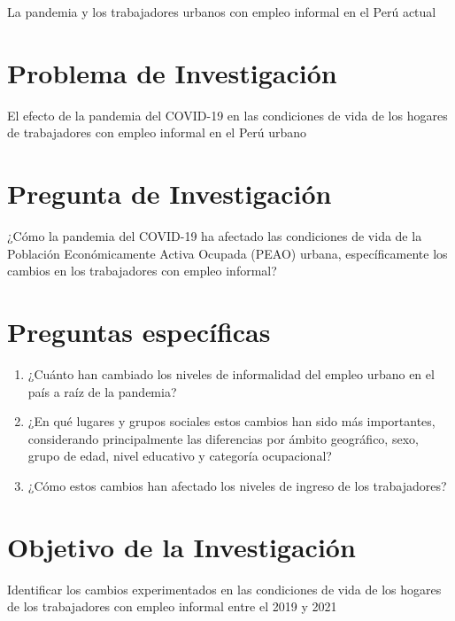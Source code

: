 \documentclass[
  letterpaper,
  12pt,
  oneside,
  spanish,
  doublespacing,
  headsepline,
  parskip]{MastersDoctoralThesis}
\begin{document}
La pandemia y los trabajadores urbanos con empleo informal en el Perú
actual

\hypertarget{problema-de-investigaciuxf3n}{%
\section{Problema de Investigación}\label{problema-de-investigaciuxf3n}}

El efecto de la pandemia del COVID-19 en las condiciones de vida de los
hogares de trabajadores con empleo informal en el Perú urbano

\hypertarget{pregunta-de-investigaciuxf3n}{%
\section{Pregunta de Investigación}\label{pregunta-de-investigaciuxf3n}}

¿Cómo la pandemia del COVID-19 ha afectado las condiciones de vida de la
Población Económicamente Activa Ocupada (PEAO) urbana, específicamente
los cambios en los trabajadores con empleo informal?

\hypertarget{preguntas-especuxedficas}{%
\section{Preguntas específicas}\label{preguntas-especuxedficas}}

\begin{enumerate}
\def\labelenumi{\arabic{enumi}.}
\item
  ¿Cuánto han cambiado los niveles de informalidad del empleo urbano en
  el país a raíz de la pandemia?
\item
  ¿En qué lugares y grupos sociales estos cambios han sido más
  importantes, considerando principalmente las diferencias por ámbito
  geográfico, sexo, grupo de edad, nivel educativo y categoría
  ocupacional?
\item
  ¿Cómo estos cambios han afectado los niveles de ingreso de los
  trabajadores?
\end{enumerate}

\hypertarget{objetivo-de-la-investigaciuxf3n}{%
\section{Objetivo de la
Investigación}\label{objetivo-de-la-investigaciuxf3n}}

Identificar los cambios experimentados en las condiciones de vida de los
hogares de los trabajadores con empleo informal entre el 2019 y 2021
\end{document}
